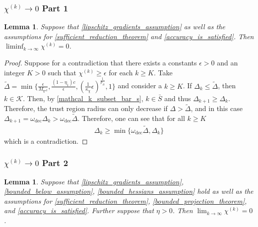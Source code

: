 \documentclass{article}
\newtheorem{lemma}[theorem]{Lemma}
\theoremstyle{case}
\newcommand{\chik}{{\chi^{(k)}}}
\newcommand{\dk}{\Delta_k}
\newcommand{\dkpo}{\Delta_{k+1}}
\newcommand{\maxhessian}{{M_{\nabla^2}}}
\newcommand{\omegadec}{\omega_{\text{dec}}}
\begin{document}
\subsubsection{$\chik \to 0$ Part 1}
\begin{lemma}
\label{liminf_chi_to_zero}
Suppose that \cref{lipschitz_gradients_assumption} as well as the assumptions for \cref{sufficient_reduction_theorem} and \cref{accuracy_is_satisfied}.
Then $\liminf_{k\to\infty} \chik = 0$.
\end{lemma}
 

\begin{proof}
Suppose for a contradiction that there exists a constants $\epsilon > 0$ and an integer $K > 0$ such that $\chik \ge \epsilon$ for each $k \ge K$.
Take $ \tilde \Delta = \min \{\frac{\epsilon}{\maxhessian}, \frac{(1 - \eta_1)c}{\epsilon}, \left(\frac 1 {\kappa_{\chi}}  \epsilon \right)^{\frac 1 {p_{\Delta}}}, 1\}$
and consider a $k \ge K$.
If $\dk \le \tilde \Delta$, then $k \in \mathcal K$.
Then, by \cref{mathcal_k_subset_bar_s},  $k \in \bar S$ and thus $\dkpo \ge \dk$.
Therefore, the trust region radius can only decrease if $\Delta > \tilde \Delta$, and in this case $\dkpo = \omegadec\dk > \omegadec \tilde \Delta$.
Therefore, one can see that for all $k \ge K$
\begin{align}
\dk \ge \min\{\omegadec \tilde \Delta, \dk \}
\end{align}
which is a contradiction.
\end{proof}



\subsubsection{$\chik \to 0$ Part 2}
\begin{lemma}
\label{lim_chi_to_zero}
Suppose that \cref{lipschitz_gradients_assumption}, \cref{bounded_below_assumption}, \cref{bounded_hessians_assumption} hold as well as the assumptions for 
\cref{sufficient_reduction_theorem}, \cref{bounded_projection_theorem}, and \cref{accuracy_is_satisfied}.
Further suppose that $\eta > 0$.
Then $\lim_{k\to\infty}\chik=0$.
\end{lemma}
\end{document}
